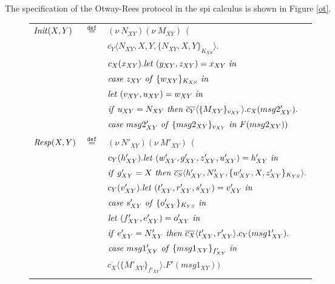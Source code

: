 \documentclass[10pt,a4paper,final,oneside,fleqn]{book}
\newcommand*{\eqdef}{\mathbin{\mathop{=}\limits^{\texttt{def}}}}
\begin{document}
The specification of the Otway-Rees protocol in the spi calculus is shown in Figure \ref{ot}.
\begin{figure}[!tbp]
\begin{center}
\begin{tabular}{|lll|}\hline
$\mbox{{\itshape Init\/}}(X,Y)$&$\eqdef$&$(\nu~\!N_{XY})(\nu~\!M_{XY})~~($\\
&&$\overline{c_{Y}}\langle N_{XY},X,Y,\{N_{XY},X,Y\}_{K_{XS}}\rangle.$\\
&&$c_{X}(x_{XY}).\mbox{{\itshape let\/} }(y_{XY},z_{XY})=x_{XY}\mbox{ {\itshape in\/}}$\\
&&$\mbox{{\itshape case\/} }z_{XY}\mbox{ {\itshape of\/} }\{w_{XY}\}_{K_{XS}}\mbox{ {\itshape in\/}}$\\
&&$\mbox{{\itshape let\/} }(v_{XY},u_{XY})=w_{XY}\mbox{ {\itshape in\/}}$\\
&&$\mbox{{\itshape if\/} }u_{XY}=N_{XY}\mbox{ {\itshape then\/} }\overline{c_{Y}}\langle\{M_{XY}\}_{v_{XY}}\rangle.c_{X}(msg2'_{XY}).$\\
&&$\mbox{{\itshape case\/} }msg2'_{XY}\mbox{ {\itshape of\/} }\{msg2_{XY}\}_{v_{XY}}\mbox{ {\itshape in\/} }F(msg2_{XY}))$\\&&\\
$\mbox{{\itshape Resp\/}}(X,Y)$&$\eqdef$&$(\nu~\!N'_{XY})(\nu~\!M'_{XY})~~($\\
&&$c_{Y}(h'_{XY}).\mbox{{\itshape let\/} }(w'_{XY},g'_{XY},z'_{XY},u'_{XY})=h'_{XY}\mbox{ {\itshape in\/}}$\\
&&$\mbox{{\itshape if\/} }g'_{XY}=X\mbox{ {\itshape then\/} }\overline{c_S}\langle h'_{XY},N'_{XY},\{w'_{XY},X,z'_{XY}\}_{K_{YS}}\rangle.$\\ &&$c_{Y}(v'_{XY}).\mbox{{\itshape let\/} }(t'_{XY},r'_{XY},s'_{XY})=v'_{XY}\mbox{ {\itshape in\/}}$\\
&&$\mbox{{\itshape case\/} }s'_{XY}\mbox{ {\itshape of\/} }\{o'_{XY}\}_{K_{YS}}\mbox{ {\itshape in\/}}$\\
&&$\mbox{{\itshape let\/} }(f'_{XY},e'_{XY})=o'_{XY}\mbox{ {\itshape in\/}}$\\
&&$\mbox{{\itshape if\/} }e'_{XY}=N'_{XY}\mbox{ {\itshape then\/} }\overline{c_{X}}\langle t'_{XY},r'_{XY}\rangle.c_{Y}(msg1'_{XY}).$\\
&&$\mbox{{\itshape case\/} }msg1'_{XY}\mbox{ {\itshape of\/} }\{msg1_{XY}\}_{f'_{XY}}\mbox{ {\itshape in\/}}$\\
&&$\overline{c_{X}}\langle\{M'_{XY}\}_{f'_{XY}}\rangle.F'(msg1_{XY}))$\\&&\\

\end{tabular}
\end{center}
\end{figure}
\end{document}
